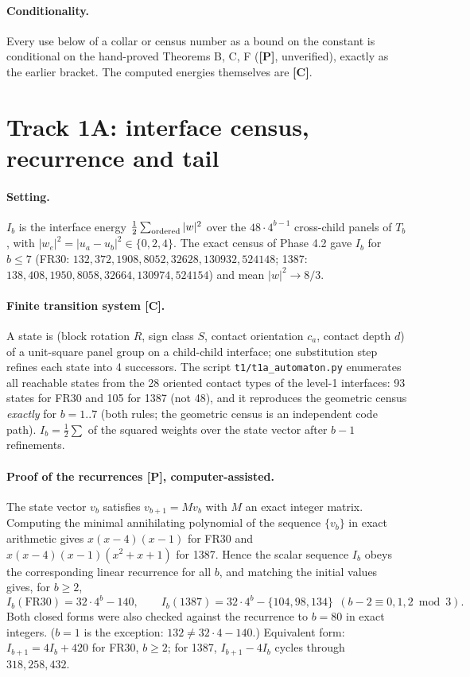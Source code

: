 \documentclass[10pt]{article}
\newcommand{\lab}[1]{\textbf{[#1]}}
\begin{document}
\paragraph{Conditionality.} Every use below of a collar or census number as a bound on the constant is conditional on the hand-proved Theorems B, C, F (\lab{P}, unverified), exactly as the earlier bracket. The computed energies themselves are \lab{C}.



\section{Track 1A: interface census, recurrence and tail}\label{sec:t1a}
\paragraph{Setting.} $I_b$ is the interface energy $\tfrac12\sum_{\rm ordered}|w|^2$ over the $48\cdot4^{b-1}$ cross-child panels of $T_b$, with $|w_e|^2=|u_a-u_b|^2\in\{0,2,4\}$. The exact census of Phase 4.2 gave $I_b$ for $b\le7$ (FR30: $132,372,1908,8052,32628,130932,524148$; 1387: $138,408,1950,8058,32664,130974,524154$) and mean $|w|^2\to8/3$.

\paragraph{Finite transition system \lab{C}.} A state is (block rotation $R$, sign class $S$, contact orientation $c_a$, contact depth $d$) of a unit-square panel group on a child-child interface; one substitution step refines each state into 4 successors. The script \texttt{t1/t1a\_automaton.py} enumerates all reachable states from the 28 oriented contact types of the level-1 interfaces: 93 states for FR30 and 105 for 1387 (not 48), and it reproduces the geometric census \emph{exactly} for $b=1..7$ (both rules; the geometric census is an independent code path). $I_b=\tfrac12\sum$ of the squared weights over the state vector after $b-1$ refinements.

\paragraph{Proof of the recurrences \lab{P}, computer-assisted.} The state vector $v_b$ satisfies $v_{b+1}=Mv_b$ with $M$ an exact integer matrix. Computing the minimal annihilating polynomial of the sequence $\{v_b\}$ in exact arithmetic gives $x(x-4)(x-1)$ for FR30 and $x(x-4)(x-1)(x^2+x+1)$ for 1387. Hence the scalar sequence $I_b$ obeys the corresponding linear recurrence for all $b$, and matching the initial values gives, for $b\ge2$,
\[
I_b(\mathrm{FR30})=32\cdot4^b-140,\qquad I_b(1387)=32\cdot4^b-\{104,98,134\}\ \ (b-2\equiv0,1,2 \bmod 3).
\]
Both closed forms were also checked against the recurrence to $b=80$ in exact integers. ($b=1$ is the exception: $132\neq32\cdot4-140$.) Equivalent form: $I_{b+1}=4I_b+420$ for FR30, $b\ge2$; for 1387, $I_{b+1}-4I_b$ cycles through $318,258,432$.
\end{document}

